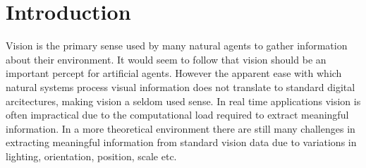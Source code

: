 \chapter{Introduction}







Vision is the primary sense used by many natural agents to gather information about their environment.
It would seem to follow that vision should be an important percept for artificial agents.
However the apparent ease with which natural systems process visual information does not translate to standard digital arcitectures, making vision a seldom used sense. 
In real time applications vision is often impractical due to the computational load required to extract meaningful information. 
In a more theoretical environment there are still many challenges in extracting meaningful information from standard vision data due to variations in lighting, orientation, position, scale etc.


